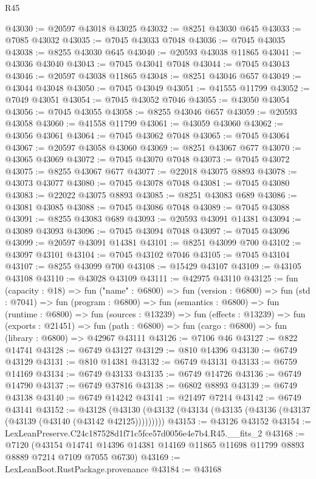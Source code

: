 \begin{lexlean}{R45}
\begin{coremodule}
{@43030 := @20597 @43018 @43025
@43032 := @8251 @43030 @645
@43033 := @7085 @43032
@43035 := @7045 @43033 @7048
@43036 := @7045 @43035
@43038 := @8255 @43030 @645
@43040 := @20593 @43038 @11865
@43041 := @43036 @43040
@43043 := @7045 @43041 @7048
@43044 := @7045 @43043
@43046 := @20597 @43038 @11865
@43048 := @8251 @43046 @657
@43049 := @43044 @43048
@43050 := @7045 @43049
@43051 := @41555 @11799
@43052 := @7049 @43051
@43054 := @7045 @43052 @7046
@43055 := @43050 @43054
@43056 := @7045 @43055
@43058 := @8255 @43046 @657
@43059 := @20593 @43058
@43060 := @41558 @11799
@43061 := @43059 @43060
@43062 := @43056 @43061
@43064 := @7045 @43062 @7048
@43065 := @7045 @43064
@43067 := @20597 @43058 @43060
@43069 := @8251 @43067 @677
@43070 := @43065 @43069
@43072 := @7045 @43070 @7048
@43073 := @7045 @43072
@43075 := @8255 @43067 @677
@43077 := @22018 @43075 @8893
@43078 := @43073 @43077
@43080 := @7045 @43078 @7048
@43081 := @7045 @43080
@43083 := @22022 @43075 @8893
@43085 := @8251 @43083 @689
@43086 := @43081 @43085
@43088 := @7045 @43086 @7048
@43089 := @7045 @43088
@43091 := @8255 @43083 @689
@43093 := @20593 @43091 @14381
@43094 := @43089 @43093
@43096 := @7045 @43094 @7048
@43097 := @7045 @43096
@43099 := @20597 @43091 @14381
@43101 := @8251 @43099 @700
@43102 := @43097 @43101
@43104 := @7045 @43102 @7046
@43105 := @7045 @43104
@43107 := @8255 @43099 @700
@43108 := @15429 @43107
@43109 := @43105 @43108
@43110 := @43028 @43109
@43111 := @42975 @43110
@43125 := fun (capacity : @18) =>
  fun ("name" : @6800) =>
  fun (version : @6800) =>
  fun (std : @7041) =>
  fun (program : @6800) =>
  fun (semantics : @6800) =>
  fun (runtime : @6800) =>
  fun (sources : @13239) =>
  fun (effects : @13239) =>
  fun (exports : @21451) =>
  fun (path : @6800) => fun (cargo : @6800) => fun (library : @6800) => @42967 @43111
@43126 := @7106 @46
@43127 := @822 @14741
@43128 := @6749 @43127
@43129 := @810 @14396
@43130 := @6749 @43129
@43131 := @810 @14381
@43132 := @6749 @43131
@43133 := @6759 @14169
@43134 := @6749 @43133
@43135 := @6749 @14726
@43136 := @6749 @14790
@43137 := @6749 @37816
@43138 := @6802 @8893
@43139 := @6749 @43138
@43140 := @6749 @14242
@43141 := @21497 @7214
@43142 := @6749 @43141
@43152 := @43128
    (@43130 (@43132 (@43134 (@43135 (@43136 (@43137 (@43139 (@43140 (@43142 @42125)))))))))
@43153 := @43126 @43152
@43154 := LexLeanPreserve.C24c187528d1f71c5fce57d0056e4e7b4.R45.__fits_2
@43168 := @7120
    (@43154 @14741 @14396 @14381 @14169 @11865 @11698 @11799 @8893 @8889 @7214 @7109 @7055 @6730)
@43169 := LexLeanBoot.RustPackage.provenance
@43184 := @43168
}
\end{coremodule}
\end{lexlean}
